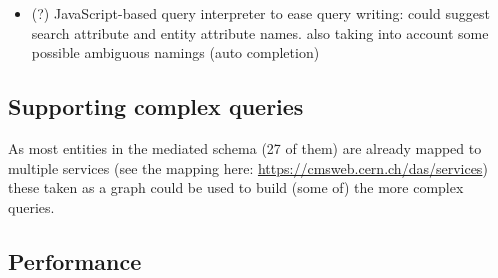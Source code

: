 \begin{itemize}
\begin{itemize}
\item knowing all possible APIs parameter values would be beneficial ({\color{red}but not yet sure if available}%
		\footnote{problem: the owners of services may not want to provide direct access to DB because of no trust, security or performance issues. Otherwise, specific APIs could be developed to return possible parameter values but this is quite an overhead}) and could be used to improve the keyword search (better mapping from keywords to API inputs) or even the structured search (e.g. query cleaning/term auto-completion)
\begin{itemize}
\item having direct access to DB, one could incrementally index target database\footnote{%
			E.g. an inverted index of values in Oracle/MySQL DB tables can be built to keep the list of possible terms. For instance, Sphinx full text search engine can access DBs directly and also supports incremental indexing but it needs a bit of manual configuration {http://sphinxsearch.com/docs/current.html\#delta-updates} }%
	tables mapping it's columns into API parameters (manually or automatically). 

\end{itemize}
	\end{itemize}
\item (?) JavaScript-based query interpreter to ease query writing: could suggest search attribute and entity attribute names. also taking into account some possible ambiguous namings (auto completion)
\end{itemize}


\subsection{Supporting complex queries}
As most entities in the mediated schema (27 of them) are already mapped to multiple services (see the mapping here: \url{https://cmsweb.cern.ch/das/services}) these taken as a graph could be used to build (some of) the more complex queries.

\subsection{Performance}



